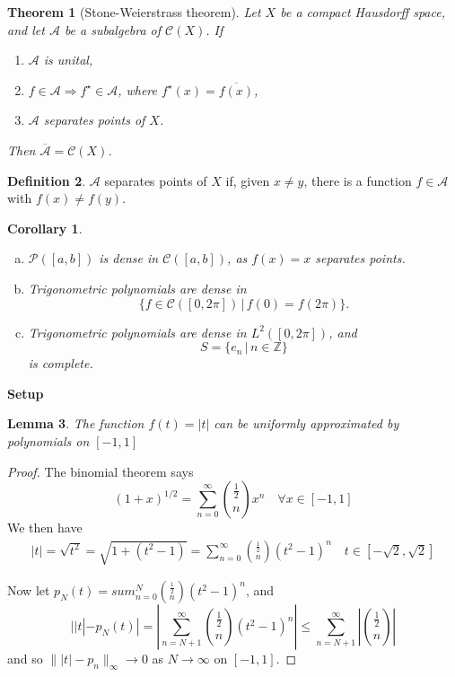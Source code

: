 \documentclass[10pt, oneside, reqno]{amsbook}
\theoremstyle{plain}%
\newtheorem{thm}{Theorem}[section]
\newtheorem{lem}[thm]{Lemma}
\newtheorem*{cor}{Corollary}
\theoremstyle{definition}
\newtheorem{defn}[thm]{Definition}
\theoremstyle{remark}
\newcommand{\given}{ \, | \,}
\newcommand{\Z}{\mathbb{Z}}
\begin{document}
\begin{thm}[Stone-Weierstrass theorem]
    Let $X$ be a compact Hausdorff space, and let $\mathcal{A}$ be a subalgebra of $\mathcal{C}(X)$. If 
    \begin{enumerate}[(1)]
        \item $\mathcal{A}$ is unital,
        \item $f \in \mathcal{A} \Rightarrow f^\star \in \mathcal{A}$, where $f^\star(x) = \overline{f(x)}$,
        \item $\mathcal{A}$ separates points of $X$.
    \end{enumerate}
    Then $\overline{\mathcal{A}} = \mathcal{C}(X)$. 
\end{thm}

\begin{defn}
    $\mathcal{A}$ separates points of $X$ if, given $x \neq y$, there is a function $f \in \mathcal{A}$ with $f(x) \neq f(y)$.  
\end{defn}
\begin{cor}
    \begin{enumerate}[(a)]
        \item $\mathcal{P}([a,b])$ is dense in $\mathcal{C}([a,b])$, as $f(x) = x$ separates points.  
        \item Trigonometric polynomials are dense in \[
            \{ f \in \mathcal{C}([0,2 \pi]) \, | \, f(0) = f(2 \pi) \}. 
        \]
        \item Trigonometric polynomials are dense in $L^2([0,2\pi])$, and \[
            S = \{ e_n \given n \in \Z \} 
        \] is complete.
    \end{enumerate}
\end{cor}

\textbf{Setup}
\begin{lem}
    The function $f(t) = |t|$ can be uniformly approximated by polynomials on $[-1,1]$  
\end{lem}
\begin{proof}
    The binomial theorem says \[
        (1 + x)^{1/2} = \sum_{n=0}^\infty {\frac{1}{2} \choose n} x^n \quad \forall x \in [-1,1]
    \]  We then have 
\begin{align*}
    |t | = \sqrt{t^2} = \sqrt{1 + (t^2 -1)} = \sum_{n=0}^\infty {\frac{1}{2} \choose n } (t^2 - 1)^n \quad t \in [-\sqrt{2}, \sqrt{2}]
\end{align*}

Now let $p_N(t) = sum_{n=0}^N {\frac{1}{2} \choose n } (t^2 - 1)^n$, and \[
    | |t| -p_N(t) | = | \sum_{n = N+1}^\infty { \frac{1}{2} \choose n}(t^2 - 1)^n | \leq \sum_{n = N+1}^\infty | {\frac{1}{2} \choose n} |
\] and so $\| |t| - p_n \|_\infty \rightarrow 0$ as $N \rightarrow \infty$ on $[-1,1]$.
\end{proof}
\end{document}
